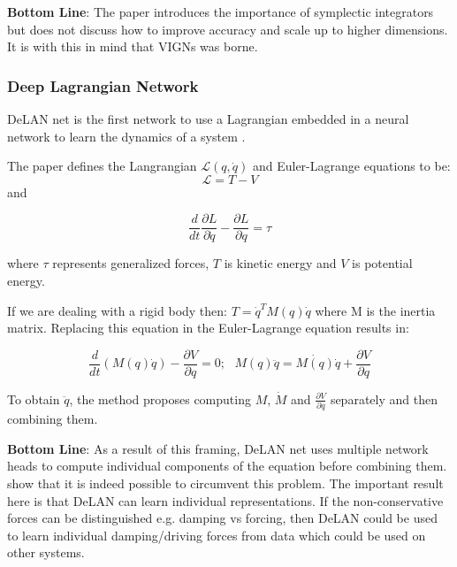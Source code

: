 \documentclass{article}
\begin{document}
\textbf{Bottom Line}: The paper introduces the importance of symplectic integrators but does not discuss how to improve accuracy and scale up to higher dimensions. It is with this in mind that VIGNs was borne.

\subsubsection{Deep Lagrangian Network}

DeLAN net is the first network to use a Lagrangian embedded in a neural network to learn the dynamics of a system \cite{lutter_deep_2019}. 

The paper defines the Langrangian $\mathcal{L} (q,\dot{q})$ and Euler-Lagrange equations to be:
\begin{equation} 
\mathcal{L} = T - V
\end{equation}
and

\begin{equation}
\frac{d}{dt}\frac{\partial L}{\partial \dot{q}} - \frac{\partial L}{\partial q} = \tau
\end{equation}

where $\tau$ represents generalized forces, $T$ is kinetic energy and $V$ is potential energy.

If we are dealing with a rigid body then: $ T = \dot{q}^T M(q) \dot{q} $ where M is the inertia matrix. Replacing this equation in the Euler-Lagrange equation results in:

\begin{equation}
 \frac{d}{dt} (M(q)\dot{q}) - \frac{\partial V}{\partial q} = 0; 
~~~
M(q)\ddot{q} = \dot{M(q)} \dot{q} + \frac{\partial V}{\partial q} 
\end{equation}

To obtain $\ddot{q}$, the method proposes computing $M$, $\dot{M}$ and $\frac{\partial V}{\partial q}$ separately and then combining them.  

\textbf{Bottom Line}: As a result of this framing, DeLAN net uses multiple network heads to compute individual components of the equation before combining them. \cite{cranmer_lagrangian_2020} show that it is indeed possible to circumvent this problem. The important result here is that DeLAN can learn individual representations. If the non-conservative forces can be distinguished e.g. damping vs forcing, then DeLAN could be used to learn individual damping/driving forces from data which could be used on other systems. 
\end{document}
